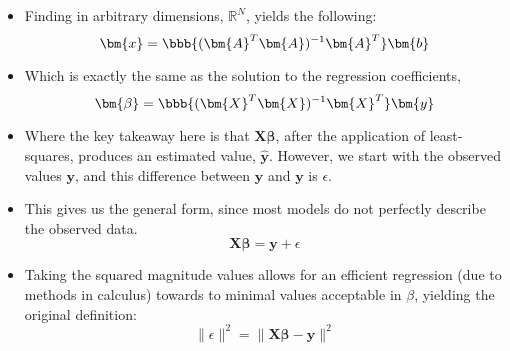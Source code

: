 \begin{itemize}
\begin{itemize}
    \item Finding \hyperref[Projections]{} in arbitrary dimensions, \(\mathbb{R}^N\), yields the following: 
    \[%
    \bm{x} = \bbb{(\bm{A}^T \bm{A})^{-1} \bm{A}^T} \bm{b}
    \]%
    \item Which is exactly the same as the solution to the regression coefficients,
    \[%
    \bm{\beta} = \bbb{(\bm{X}^T \bm{X})^{-1} \bm{X}^T} \bm{y}
    \]%
    \item Where the key takeaway here is that \(\bm{X\beta}\), after the application of least-squares, produces an estimated value, \(\bm{\hat{y}}\). However, we start with the observed values \(\bm{y}\), and this difference between \(\bm{\hat{y}}\) and \(\bm{y}\) is \(\epsilon\). 
    \item This gives us the general form, since most models do not perfectly describe the observed data.
    \[%
    \bm{X\beta} = \bm{y} + \epsilon
    \]%
    \item Taking the squared magnitude values allows for an efficient regression (due to methods in calculus) towards to minimal values acceptable in \(\beta \), yielding the original definition:
    \[%
    \| \epsilon \|^2 = \| \bm{X\beta - y}\|^2
    \]%
    
  \end{itemize}
  
\end{itemize}
